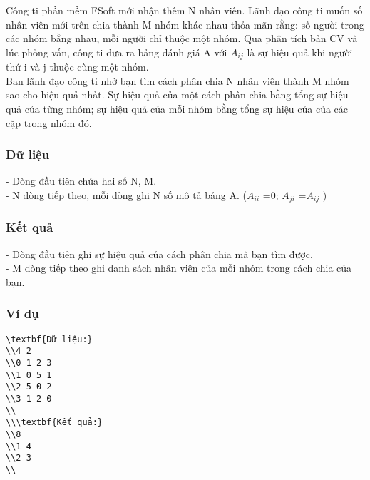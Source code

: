 







   Công ti phần mềm FSoft mới nhận thêm N nhân viên. Lãnh đạo công ti muốn số nhân viên mới trên chia thành M nhóm khác nhau thỏa mãn rằng: số người trong các nhóm bằng nhau, mỗi người chỉ thuộc một nhóm. Qua phân tích bản CV và lúc phỏng vấn, công ti đưa ra bảng đánh giá A với $A_{ij}$   là sự hiệu quả khi người thứ i và j thuộc cùng một nhóm.   
\\   Ban lãnh đạo công ti nhờ bạn tìm cách phân chia N nhân viên thành M nhóm sao cho hiệu quả nhất. Sự hiệu quả của một cách phân chia bằng tổng sự hiệu quả của từng nhóm; sự hiệu quả của mỗi nhóm bằng tổng sự hiệu của của các cặp trong nhóm đó.  

\subsubsection{   Dữ liệu  }

   - Dòng đầu tiên chứa hai số N, M.   
\\   - N dòng tiếp theo, mỗi dòng ghi N số mô tả bảng A. ($A_{ii}$   =0; $A_{ji}$   =$A_{ij}$   )  

\subsubsection{   Kết quả  }

   - Dòng đầu tiên ghi sự hiệu quả của cách phân chia mà bạn tìm được.   
\\   - M dòng tiếp theo ghi danh sách nhân viên của mỗi nhóm trong cách chia của bạn.  

\subsubsection{   Ví dụ  }
\begin{verbatim}
\textbf{Dữ liệu:}
\\4 2
\\0 1 2 3
\\1 0 5 1
\\2 5 0 2
\\3 1 2 0
\\
\\\textbf{Kết quả:}
\\8
\\1 4
\\2 3
\\\end{verbatim}

